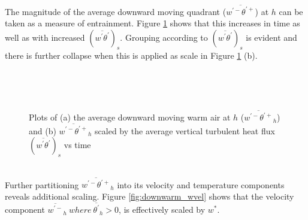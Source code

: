 The magnitude of the average downward moving quadrant ($\overline{w^{'-}\theta^{'+}}$) at $h$ can be taken as a measure of entrainment.  Figure \ref{fig:downwarm} shows that this increases in time as well as with increased $(\overline{w^{'}\theta^{'}})_{s}$.  Grouping according to $(\overline{w^{'}\theta^{'}})_{s}$ is evident and there is further collapse when this is applied as scale in Figure \ref{fig:downwarm} (b).\\

\begin{figure}[htbp]
\begin{minipage}[b]{0.5\linewidth}
        \\
        \end{minipage}             
\quad
\begin{minipage}[b]{0.5\linewidth}
        \\
     
       \end{minipage}
        \caption[Downward moving warm air at $h$]{Plots of (a) the average downward moving warm air at $h$ ($\overline{w^{\prime-}\theta^{\prime+}}_{h}$) and (b) $\overline{w^{\prime-}\theta^{\prime+}}_{h}$ scaled by the average vertical turbulent heat flux $(\overline{w^{\prime}\theta^{\prime}})_{s}$ vs time}
        \label{fig:downwarm}
\end{figure}\\

Further partitioning $\overline{w^{'-}\theta^{'+}}_{h}$ into its velocity and temperature components reveals additional scaling.  Figure \ref{fig:downwarm_wvel} shows that the velocity component $\overline{w^{'-}}_{h} \ where \ \overline{\theta^{'}}_{h}>0$, is effectively scaled by $w^{*}$.\\   

